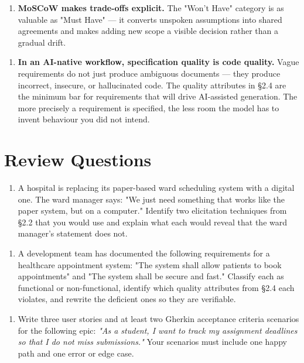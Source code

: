 \documentclass[11pt,a4paper]{book}
\begin{document}
\begin{enumerate}
  \item \textbf{MoSCoW makes trade-offs explicit.} The "Won't Have" category is as valuable as "Must Have" --- it converts unspoken assumptions into shared agreements and makes adding new scope a visible decision rather than a gradual drift.
\end{enumerate}

\begin{enumerate}
  \item \textbf{In an AI-native workflow, specification quality is code quality.} Vague requirements do not just produce ambiguous documents --- they produce incorrect, insecure, or hallucinated code. The quality attributes in §2.4 are the minimum bar for requirements that will drive AI-assisted generation. The more precisely a requirement is specified, the less room the model has to invent behaviour you did not intend.
\end{enumerate}

\medskip

\section{Review Questions}

\begin{enumerate}
  \item A hospital is replacing its paper-based ward scheduling system with a digital one. The ward manager says: "We just need something that works like the paper system, but on a computer." Identify two elicitation techniques from §2.2 that you would use and explain what each would reveal that the ward manager's statement does not.
\end{enumerate}

\begin{enumerate}
  \item A development team has documented the following requirements for a healthcare appointment system: "The system shall allow patients to book appointments" and "The system shall be secure and fast." Classify each as functional or non-functional, identify which quality attributes from §2.4 each violates, and rewrite the deficient ones so they are verifiable.
\end{enumerate}

\begin{enumerate}
  \item Write three user stories and at least two Gherkin acceptance criteria scenarios for the following epic: \textit{"As a student, I want to track my assignment deadlines so that I do not miss submissions."} Your scenarios must include one happy path and one error or edge case.
\end{enumerate}
\end{document}
